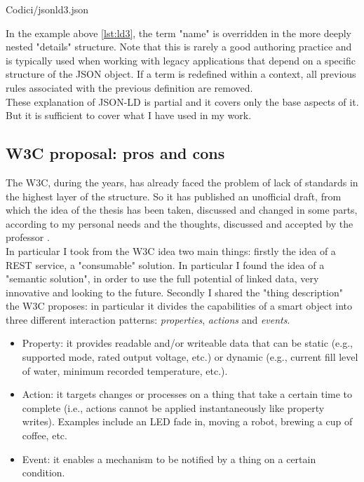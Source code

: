 \begin{lstinputlisting}[
    morekeywords={ciao, @context, name, details, @id, @type, @value, bye},
		caption={JSON-LD: multiple @context example},
		label=lst:ld3]
		{Codici/jsonld3.json}
\end{lstinputlisting}

In the example above \ref{lst:ld3}, the term "name" is overridden in the more deeply nested "details" structure. Note that this is rarely a good authoring practice and is typically used when working with legacy applications that depend on a specific structure of the JSON object. If a term is redefined within a context, all previous rules associated with the previous definition are removed. \\
These explanation of JSON-LD is partial and it covers only the base aspects of it. \cite{jsonlddraft} But it is sufficient to cover what I have used in my work.

\subsection{W3C proposal: pros and cons}
The W3C, during the years, has already faced the problem of lack of standards in the highest layer of the structure. So it has published an unofficial draft, from which the idea of the thesis has been taken, discussed and changed in some parts, according to my personal needs and the thoughts, discussed and accepted by the professor \cite{w3cwot}.\\
In particular I took from the W3C idea two main things: firstly the idea of a REST service, a "consumable" solution. In particular I found the idea of a "semantic solution", in order to use the full potential of linked data, very innovative and looking to the future. Secondly I shared the "thing description" the W3C proposes: in particular it divides the capabilities of a smart object into three different interaction patterns: \textit{properties}, \textit{actions} and \textit{events}.

\begin{itemize}

	\item Property: it provides readable and/or writeable data that can be static (e.g., supported mode, rated output voltage, etc.) or dynamic (e.g., current fill level of water, minimum recorded temperature, etc.).
	
	\item Action: it targets changes or processes on a thing that take a certain time to complete (i.e., actions cannot be applied instantaneously like property writes). Examples include an LED fade in, moving a robot, brewing a cup of coffee, etc. 
	
	\item Event: it enables a mechanism to be notified by a thing on a certain condition.
		
\end{itemize}


